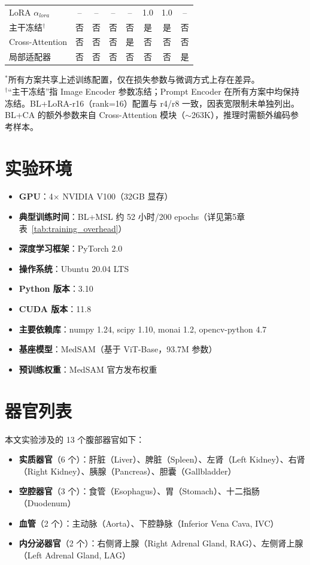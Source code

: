 \begin{table}[htbp]
\begin{tabular}{lccccccc}
    LoRA $\alpha_{lora}$ & -- & -- & -- & -- & 1.0 & 1.0 & -- \\
    主干冻结$^\dag$ & 否 & 否 & 否 & 否 & 是 & 是 & 否 \\
    Cross-Attention & 否 & 否 & 否 & 是 & 否 & 否 & 否 \\
    局部适配器 & 否 & 否 & 否 & 否 & 否 & 否 & 是 \\
    \hline
  \end{tabular}
  \vspace{2pt}
  \parbox{\textwidth}{\footnotesize $^*$所有方案共享上述训练配置，仅在损失参数与微调方式上存在差异。\\
  $^\dag$“主干冻结”指 Image Encoder 参数冻结；Prompt Encoder 在所有方案中均保持冻结。BL+LoRA-r16（rank=16）配置与 r4/r8 一致，因表宽限制未单独列出。BL+CA 的额外参数来自 Cross-Attention 模块（$\sim$263K），推理时需额外编码参考样本。}
\end{table}

\section{实验环境}

\begin{itemize}
  \item \textbf{GPU}：4$\times$ NVIDIA V100（32GB 显存）
  \item \textbf{典型训练时间}：BL+MSL 约 52 小时/200 epochs（详见第5章表~\ref{tab:training_overhead}）
  \item \textbf{深度学习框架}：PyTorch 2.0
  \item \textbf{操作系统}：Ubuntu 20.04 LTS
  \item \textbf{Python 版本}：3.10
  \item \textbf{CUDA 版本}：11.8
  \item \textbf{主要依赖库}：numpy 1.24, scipy 1.10, monai 1.2, opencv-python 4.7
  \item \textbf{基座模型}：MedSAM（基于 ViT-Base，93.7M 参数）
  \item \textbf{预训练权重}：MedSAM 官方发布权重\cite{ma2024medsam}
\end{itemize}

\section{器官列表}

本文实验涉及的 13 个腹部器官如下：

\begin{itemize}
  \item \textbf{实质器官}（6 个）：肝脏（Liver）、脾脏（Spleen）、左肾（Left Kidney）、右肾（Right Kidney）、胰腺（Pancreas）、胆囊（Gallbladder）
  \item \textbf{空腔器官}（3 个）：食管（Esophagus）、胃（Stomach）、十二指肠（Duodenum）
  \item \textbf{血管}（2 个）：主动脉（Aorta）、下腔静脉（Inferior Vena Cava, IVC）
  \item \textbf{内分泌器官}（2 个）：右侧肾上腺（Right Adrenal Gland, RAG）、左侧肾上腺（Left Adrenal Gland, LAG）
\end{itemize}

